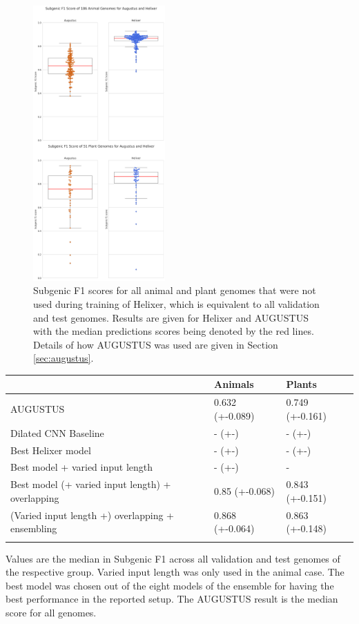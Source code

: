 \documentclass{bioinfo}
\begin{document}
\begin{figure}[!tpb]
	\centerline{\includegraphics[width=0.45\textwidth]{images/overall_boxplot}}
	\caption{Subgenic F1 scores for all animal and plant genomes that were not used during training of Helixer, which is equivalent to all validation and test genomes. Results are given for Helixer and AUGUSTUS with the median predictions scores being denoted by the red lines. Details of how AUGUSTUS was used are given in Section \ref{sec:augustus}.}\label{fig:boxplot}
\end{figure}

\begin{table}[!t]
 {
\begin{tabular}{@{}lll@{}}
\toprule & Animals & Plants\\
\midrule
AUGUSTUS & 0.632 (+-0.089) & 0.749 (+-0.161)\\
Dilated CNN Baseline & - (+-) & - (+-)\\
Best Helixer model & - (+-) & - (+-) \\
Best model + varied input length & - (+-) & - \\
Best model (+ varied input length) + overlapping &  0.85 (+-0.068) & 0.843 (+-0.151) \\
(Varied input length +) overlapping + ensembling & 0.868 (+-0.064) & 0.863 (+-0.148) \\
\botrule
\end{tabular}}{Values are the median in Subgenic F1 across all validation and test genomes of the respective group. Varied input length was only used in the animal case. The best model was chosen out of the eight models of the ensemble for having the best performance in the reported setup. The AUGUSTUS result is the median score for all genomes.}
\end{table}
\end{document}
